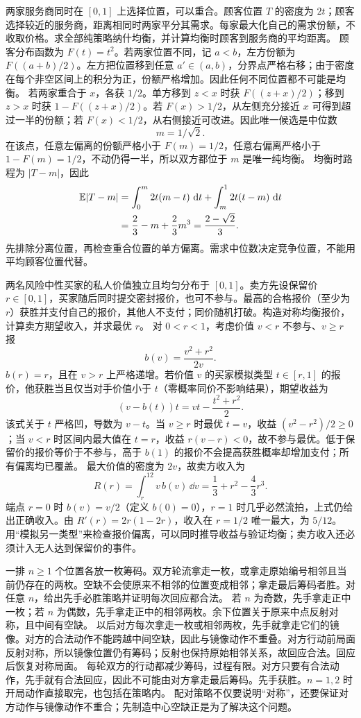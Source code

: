 两家服务商同时在 $[0,1]$ 上选择位置，可以重合。顾客位置 $T$ 的密度为 $2t$；顾客选择较近的服务商，距离相同时两家平分其需求。每家最大化自己的需求份额，不收取价格。求全部纯策略纳什均衡，并计算均衡时顾客到服务商的平均距离。
\solution 顾客分布函数为 $F(t)=t^2$。若两家位置不同，记 $a<b$，左方份额为 $F((a+b)/2)$。左方把位置移到任意 $a'\in(a,b)$，分界点严格右移；由于密度在每个非空区间上的积分为正，份额严格增加。因此任何不同位置都不可能是均衡。
若两家重合于 $x$，各获 $1/2$。单方移到 $z<x$ 时获 $F((z+x)/2)$；移到 $z>x$ 时获 $1-F((z+x)/2)$。若 $F(x)>1/2$，从左侧充分接近 $x$ 可得到超过一半的份额；若 $F(x)<1/2$，从右侧接近可改进。因此唯一候选是中位数
\[
 m=1/\sqrt2.
\]
在该点，任意左偏离的份额严格小于 $F(m)=1/2$，任意右偏离严格小于 $1-F(m)=1/2$，不动仍得一半，所以双方都位于 $m$ 是唯一纯均衡。
均衡时路程为 $|T-m|$，因此
\[
 \begin{aligned}
 \mathbb{E}|T-m|&=\int_0^m2t(m-t)\,\,\mathrm{d} t
       +\int_m^12t(t-m)\,\,\mathrm{d} t\\
 &=\frac23-m+\frac23m^3=\frac{2-\sqrt2}{3}.
 \end{aligned}
\]
\insight 先排除分离位置，再检查重合位置的单方偏离。需求中位数决定竞争位置，不能用平均顾客位置代替。

两名风险中性买家的私人价值独立且均匀分布于 $[0,1]$。卖方先设保留价 $r\in[0,1]$，买家随后同时提交密封报价，也可不参与。最高的合格报价（至少为 $r$）获胜并支付自己的报价，其他人不支付；同价随机打破。构造对称均衡报价，计算卖方期望收入，并求最优 $r$。
\solution 对 $0<r<1$，考虑价值 $v<r$ 不参与、$v\ge r$ 报
\[
 b(v)=\frac{v^2+r^2}{2v}.
\]
$b(r)=r$，且在 $v>r$ 上严格递增。若价值 $v$ 的买家模拟类型 $t\in[r,1]$ 的报价，他获胜当且仅当对手价值小于 $t$（零概率同价不影响结果），期望收益为
\[
 (v-b(t))t=vt-\frac{t^2+r^2}{2}.
\]
该式关于 $t$ 严格凹，导数为 $v-t$。当 $v\ge r$ 时最优 $t=v$，收益 $(v^2-r^2)/2\ge0$；当 $v<r$ 时区间内最大值在 $t=r$，收益 $r(v-r)<0$，故不参与最优。低于保留价的报价等价于不参与，高于 $b(1)$ 的报价不会提高获胜概率却增加支付；所有偏离均已覆盖。
最大价值的密度为 $2v$，故卖方收入为
\[
 R(r)=\int_r^12v\,b(v)\,\dd v
 =\frac13+r^2-\frac43r^3.
\]
端点 $r=0$ 时 $b(v)=v/2$（定义 $b(0)=0$），$r=1$ 时几乎必然流拍，上式仍给出正确收入。由 $R'(r)=2r(1-2r)$，收入在 $r=1/2$ 唯一最大，为 $5/12$。
\insight 用“模拟另一类型”来检查报价偏离，可以同时推导收益与验证均衡；卖方收入还必须计入无人达到保留价的事件。

一排 $n\ge1$ 个位置各放一枚筹码。双方轮流拿走一枚，或拿走原始编号相邻且当前仍存在的两枚。空缺不会使原来不相邻的位置变成相邻；拿走最后筹码者胜。对任意 $n$，给出先手必胜策略并证明每次回应都合法。
\solution 若 $n$ 为奇数，先手拿走正中一枚；若 $n$ 为偶数，先手拿走正中的相邻两枚。余下位置关于原来中点反射对称，且中间有空缺。
以后对方每次拿走一枚或相邻两枚，先手就拿走它们的镜像。对方的合法动作不能跨越中间空缺，因此与镜像动作不重叠。对方行动前局面反射对称，所以镜像位置仍有筹码；反射也保持原始相邻关系，故回应合法。回应后恢复对称局面。
每轮双方的行动都减少筹码，过程有限。对方只要有合法动作，先手就有合法回应，因此不可能由对方拿走最后筹码。先手获胜。$n=1,2$ 时开局动作直接取完，也包括在策略内。
\insight 配对策略不仅要说明“对称”，还要保证对方动作与镜像动作不重合；先制造中心空缺正是为了解决这个问题。

